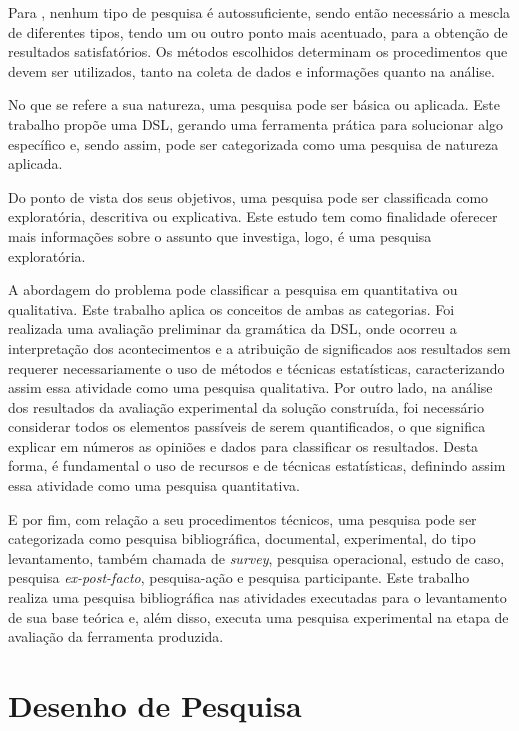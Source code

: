 Para , nenhum tipo de pesquisa é autossuficiente, sendo então necessário a mescla de diferentes tipos, tendo um ou outro ponto mais acentuado, para a obtenção de resultados satisfatórios. 
Os métodos escolhidos determinam os procedimentos que devem ser utilizados, tanto na coleta de dados e informações quanto na análise. 

No que se refere a sua natureza, uma pesquisa pode ser básica ou aplicada. 
Este trabalho propõe uma \ac{DSL}, gerando uma ferramenta prática para solucionar algo específico e, sendo assim, pode ser categorizada como uma pesquisa de natureza aplicada.

Do ponto de vista dos seus objetivos, uma pesquisa pode ser classificada como exploratória, descritiva ou explicativa. 
Este estudo tem como finalidade oferecer mais informações sobre o assunto que investiga, logo, é uma pesquisa exploratória. 

A abordagem do problema pode classificar a pesquisa em quantitativa ou qualitativa. 
Este trabalho aplica os conceitos de ambas as categorias.
Foi realizada uma avaliação preliminar da gramática da \ac{DSL}, onde ocorreu a interpretação dos acontecimentos e a atribuição de significados aos resultados sem requerer necessariamente o uso de métodos e técnicas estatísticas, caracterizando assim essa atividade como uma pesquisa qualitativa. 
Por outro lado, na análise dos resultados da avaliação experimental da solução construída, foi necessário considerar todos os elementos passíveis de serem quantificados, o que significa explicar em números as opiniões e dados para classificar os resultados. 
Desta forma, é fundamental o uso de recursos e de técnicas estatísticas, definindo assim essa atividade como uma pesquisa quantitativa.

E por fim, com relação a seu procedimentos técnicos, uma pesquisa pode ser categorizada como pesquisa bibliográfica, documental, experimental, do tipo levantamento, também chamada de \textit{survey}, pesquisa operacional, estudo de caso, pesquisa \textit{ex-post-facto}, pesquisa-ação e pesquisa participante. 
Este trabalho realiza uma pesquisa bibliográfica nas atividades executadas para o levantamento de sua base teórica e, além disso, executa uma pesquisa experimental na etapa de avaliação da ferramenta produzida.

\section{Desenho de Pesquisa} \label{sec:DesenhoPesquisa}

